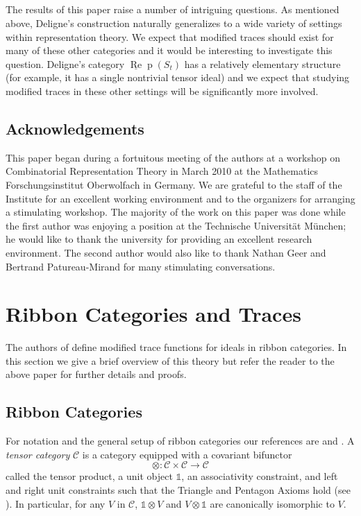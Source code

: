 \documentclass[12pt, reqno]{amsart}
\theoremstyle{definition}
\def\uRep{\underline{\operatorname{Re}}\!\operatorname{p}}
\renewcommand{\1}{_{(1)}}
\renewcommand{\2}{_{(2)}}
\newcommand{\3}{_{(3)}}
\newcommand{\4}{_{(4)}}
\newcommand{\cat}{\mathcal{C}}
\newcommand{\unit}{\ensuremath{\mathds{1}}}
\begin{document}
\subsection{}  The results of this paper raise a number of intriguing questions.  As mentioned above, Deligne's construction naturally generalizes to a wide variety of settings within representation theory.  We expect that modified traces should exist for many of these other categories and it would be interesting to investigate this question. Deligne's category $\uRep (S_{t})$ has a relatively elementary structure (for example, it has a single nontrivial tensor ideal) and we expect that studying modified traces in these other settings will be significantly more involved.  

\subsection{Acknowledgements}  This paper began during a fortuitous meeting of the authors at a workshop on Combinatorial Representation Theory in March 2010 at the Mathematics Forschungsinstitut Oberwolfach in Germany.  We are grateful to the staff of the Institute for an excellent working environment and to the organizers for arranging a stimulating workshop.  The majority of the work on this paper was done while the first author was enjoying a position at the Technische Universit\"at M\"unchen; he would like to thank the university for providing an excellent research environment.  The second author would also like to thank Nathan Geer and Bertrand Patureau-Mirand for many stimulating conversations. 

\section{Ribbon Categories and Traces}\label{S:ribboncategories}   The authors of \cite{GKP} define modified trace functions for ideals in ribbon categories.  In this section we give a brief overview of this theory but refer the reader to the above paper for further details and proofs. 

\subsection{Ribbon Categories}\label{SS:ribboncats}  For notation and the general setup of ribbon categories our references are \cite{Tu} and \cite{Kas}.  A \emph{tensor category} $\cat$ is a category equipped with a covariant
bifunctor 
\[
\otimes :\cat \times \cat\rightarrow \cat
\]
called the tensor product, a unit object $\unit$, an associativity constraint, and left and
right unit constraints such that the Triangle and Pentagon Axioms hold (see \cite[XI.2]{Kas}).  In particular, for any $V$ in $\cat$, $\unit \otimes V$ and $V \otimes \unit$ are canonically isomorphic to $V$.
\end{document}
